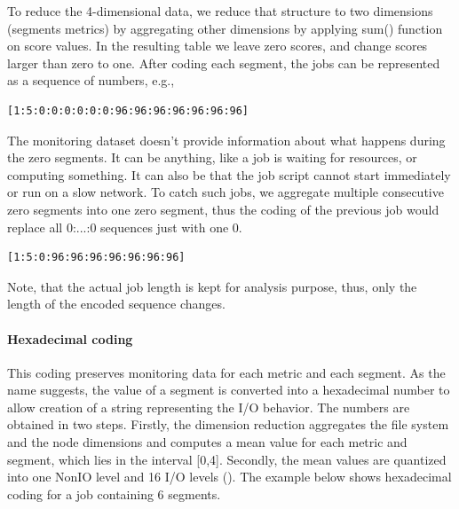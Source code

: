 \documentclass{jhps}
\begin{document}
To reduce the 4-dimensional data, we reduce that structure to two dimensions (segments metrics) by aggregating other dimensions by applying sum() function on score values.
In the resulting table we leave zero scores, and change scores larger than zero to one.
After coding each segment, the jobs can be represented as a sequence of numbers, e.g.,

\begin{lstlisting}[caption={Binary coding of a 15 segments long job.}]
[1:5:0:0:0:0:0:0:96:96:96:96:96:96:96]
\end{lstlisting}

The monitoring dataset doesn't provide information about what happens during the zero segments.
It can be anything, like a job is waiting for resources, or computing something.
It can also be that the job script cannot start immediately or run on a slow network.
To catch such jobs, we aggregate multiple consecutive zero segments into one zero segment, thus the coding of the previous job would replace all 0:...:0 sequences just with one 0.

\begin{lstlisting}[caption={Binary coding of a 15 segments long job with zero aggregation applied.}]
[1:5:0:96:96:96:96:96:96:96]
\end{lstlisting}

Note, that the actual job length is kept for analysis purpose, thus, only the length of the encoded sequence changes.

\paragraph*{Hexadecimal coding}

This coding preserves monitoring data for each metric and each segment.
As the name suggests, the value of a segment is converted into a hexadecimal number to allow creation of a string representing the I/O behavior.
The numbers are obtained in two steps.
Firstly, the dimension reduction aggregates the file system and the node dimensions and computes a mean value for each metric and segment, which lies in the interval [0,4].
Secondly, the mean values are quantized into one NonIO level and 16 I/O levels ().
The example below shows hexadecimal coding for a job containing 6 segments.
\end{document}
